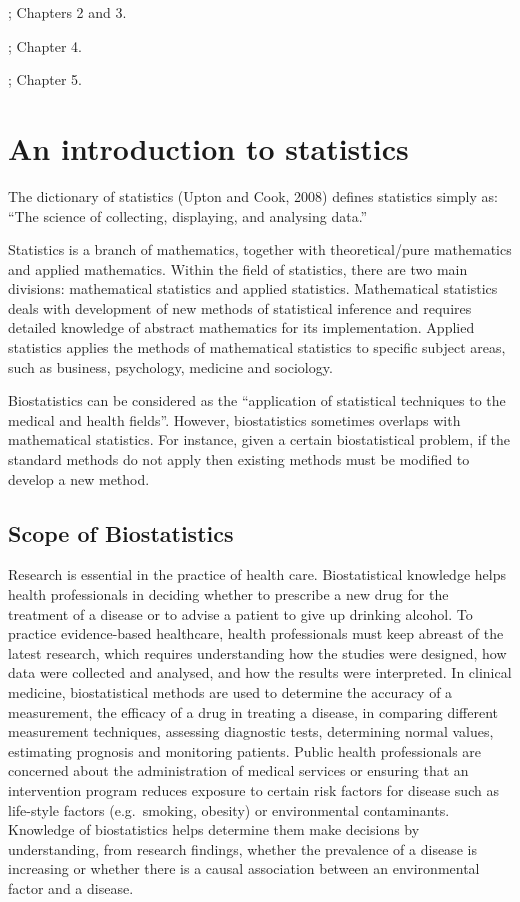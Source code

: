 \documentclass[
]{memoir}
\begin{document}
\citet{kirkwood_sterne01}; Chapters 2 and 3.

\citet{bland15}; Chapter 4.

\citet{acock10}; Chapter 5.

\hypertarget{an-introduction-to-statistics}{%
\section{An introduction to statistics}\label{an-introduction-to-statistics}}

The dictionary of statistics (Upton and Cook, 2008) defines statistics simply as: ``The science of collecting, displaying, and analysing data.''

Statistics is a branch of mathematics, together with theoretical/pure mathematics and applied mathematics. Within the field of statistics, there are two main divisions: mathematical statistics and applied statistics. Mathematical statistics deals with development of new methods of statistical inference and requires detailed knowledge of abstract mathematics for its implementation. Applied statistics applies the methods of mathematical statistics to specific subject areas, such as business, psychology, medicine and sociology.

Biostatistics can be considered as the ``application of statistical techniques to the medical and health fields''. However, biostatistics sometimes overlaps with mathematical statistics. For instance, given a certain biostatistical problem, if the standard methods do not apply then existing methods must be modified to develop a new method.

\hypertarget{scope-of-biostatistics}{%
\subsection{Scope of Biostatistics}\label{scope-of-biostatistics}}

Research is essential in the practice of health care. Biostatistical knowledge helps health professionals in deciding whether to prescribe a new drug for the treatment of a disease or to advise a patient to give up drinking alcohol. To practice evidence-based healthcare, health professionals must keep abreast of the latest research, which requires understanding how the studies were designed, how data were collected and analysed, and how the results were interpreted. In clinical medicine, biostatistical methods are used to determine the accuracy of a measurement, the efficacy of a drug in treating a disease, in comparing different measurement techniques, assessing diagnostic tests, determining normal values, estimating prognosis and monitoring patients. Public health professionals are concerned about the administration of medical services or ensuring that an intervention program reduces exposure to certain risk factors for disease such as life-style factors (e.g.~smoking, obesity) or environmental contaminants. Knowledge of biostatistics helps determine them make decisions by understanding, from research findings, whether the prevalence of a disease is increasing or whether there is a causal association between an environmental factor and a disease.
\end{document}
